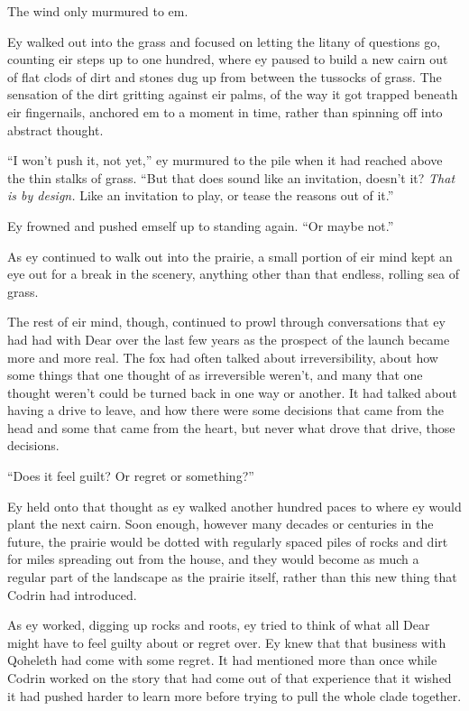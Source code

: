 The wind only murmured to em.

Ey walked out into the grass and focused on letting the litany of questions go, counting eir steps up to one hundred, where ey paused to build a new cairn out of flat clods of dirt and stones dug up from between the tussocks of grass. The sensation of the dirt gritting against eir palms, of the way it got trapped beneath eir fingernails, anchored em to a moment in time, rather than spinning off into abstract thought.

``I won't push it, not yet,'' ey murmured to the pile when it had reached above the thin stalks of grass. ``But that does sound like an invitation, doesn't it? \emph{That is by design.} Like an invitation to play, or tease the reasons out of it.''

Ey frowned and pushed emself up to standing again. ``Or maybe not.''

As ey continued to walk out into the prairie, a small portion of eir mind kept an eye out for a break in the scenery, anything other than that endless, rolling sea of grass.

The rest of eir mind, though, continued to prowl through conversations that ey had had with Dear over the last few years as the prospect of the launch became more and more real. The fox had often talked about irreversibility, about how some things that one thought of as irreversible weren't, and many that one thought weren't could be turned back in one way or another. It had talked about having a drive to leave, and how there were some decisions that came from the head and some that came from the heart, but never what drove that drive, those decisions.

``Does it feel guilt? Or regret or something?''

Ey held onto that thought as ey walked another hundred paces to where ey would plant the next cairn. Soon enough, however many decades or centuries in the future, the prairie would be dotted with regularly spaced piles of rocks and dirt for miles spreading out from the house, and they would become as much a regular part of the landscape as the prairie itself, rather than this new thing that Codrin had introduced.

As ey worked, digging up rocks and roots, ey tried to think of what all Dear might have to feel guilty about or regret over. Ey knew that that business with Qoheleth had come with some regret. It had mentioned more than once while Codrin worked on the story that had come out of that experience that it wished it had pushed harder to learn more before trying to pull the whole clade together.

